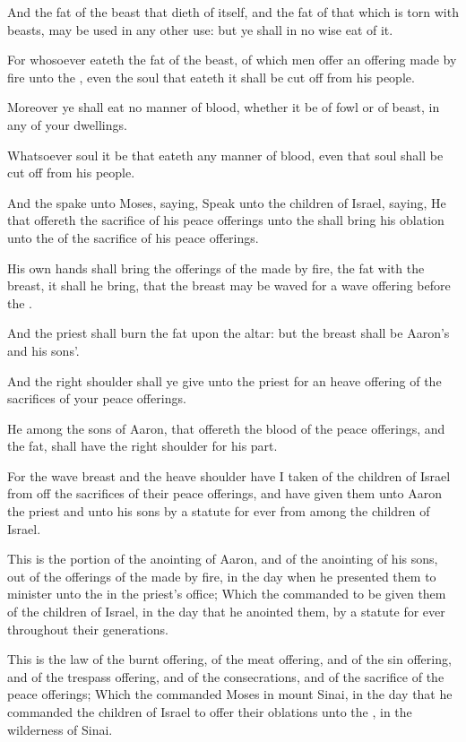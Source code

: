 \verse And the fat of the beast that dieth of itself, and the fat of that which is torn with beasts, may be used in any other use: but ye shall in no wise eat of it.

\verse For whosoever eateth the fat of the beast, of which men offer an offering made by fire unto the \LORD, even the soul that eateth it shall be cut off from his people.

\verse Moreover ye shall eat no manner of blood, whether it be of fowl or of beast, in any of your dwellings.

\verse Whatsoever soul it be that eateth any manner of blood, even that soul shall be cut off from his people.

\verse And the \LORD spake unto Moses, saying, \verse Speak unto the children of Israel, saying, He that offereth the sacrifice of his peace offerings unto the \LORD shall bring his oblation unto the \LORD of the sacrifice of his peace offerings.

\verse His own hands shall bring the offerings of the \LORD made by fire, the fat with the breast, it shall he bring, that the breast may be waved for a wave offering before the \LORD.

\verse And the priest shall burn the fat upon the altar: but the breast shall be Aaron's and his sons'.

\verse And the right shoulder shall ye give unto the priest for an heave offering of the sacrifices of your peace offerings.

\verse He among the sons of Aaron, that offereth the blood of the peace offerings, and the fat, shall have the right shoulder for his part.

\verse For the wave breast and the heave shoulder have I taken of the children of Israel from off the sacrifices of their peace offerings, and have given them unto Aaron the priest and unto his sons by a statute for ever from among the children of Israel.

\verse This is the portion of the anointing of Aaron, and of the anointing of his sons, out of the offerings of the \LORD made by fire, in the day when he presented them to minister unto the \LORD in the priest's office; \verse Which the \LORD commanded to be given them of the children of Israel, in the day that he anointed them, by a statute for ever throughout their generations.

\verse This is the law of the burnt offering, of the meat offering, and of the sin offering, and of the trespass offering, and of the consecrations, and of the sacrifice of the peace offerings; \verse Which the \LORD commanded Moses in mount Sinai, in the day that he commanded the children of Israel to offer their oblations unto the \LORD, in the wilderness of Sinai.

